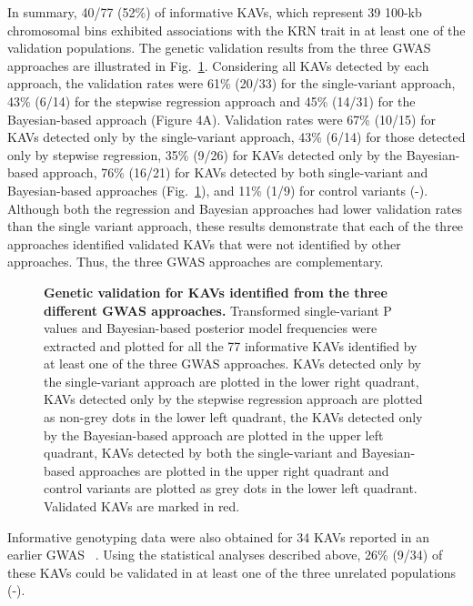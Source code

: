 \documentclass[10pt,letterpaper]{article}
\begin{document}
In summary, 40/77 (52\%) of informative KAVs, which represent 39 100-kb chromosomal bins exhibited associations with the KRN trait in at least one of the validation populations. The genetic validation results from the three GWAS approaches are illustrated in Fig.~\ref{fig4}. Considering all KAVs detected by each approach, the validation rates were 61\% (20/33) for the single-variant approach, 43\% (6/14) for the stepwise regression approach and 45\% (14/31) for the Bayesian-based approach (Figure 4A). Validation rates were 67\% (10/15) for KAVs detected only by the single-variant approach, 43\% (6/14) for those detected only by stepwise regression, 35\% (9/26) for KAVs detected only by the Bayesian-based approach, 76\% (16/21) for KAVs detected by both single-variant and Bayesian-based approaches (Fig.~\ref{fig4}), and 11\% (1/9) for control variants (-). Although both the regression and Bayesian approaches had lower validation rates than the single variant approach, these results demonstrate that each of the three approaches identified validated KAVs that were not identified by other approaches. Thus, the three GWAS approaches are complementary. 

\begin{figure}[h]
\caption{{\bf Genetic validation for KAVs identified from the three different GWAS approaches.}
Transformed single-variant P values and Bayesian-based posterior model frequencies were extracted and plotted for all the 77 informative KAVs identified by at least one of the three GWAS approaches. KAVs detected only by the single-variant approach are plotted in the lower right quadrant, KAVs detected only by the stepwise regression approach are plotted as non-grey dots in the lower left quadrant, the KAVs detected only by the Bayesian-based approach are plotted in the upper left quadrant, KAVs detected by both the single-variant and Bayesian-based approaches are plotted in the upper right quadrant and control variants are plotted as grey dots in the lower left quadrant. Validated KAVs are marked in red.}
\label{fig4}
\end{figure}

Informative genotyping data were also obtained for 34 KAVs reported in an earlier GWAS ~\cite{Brown2011}. Using the statistical analyses described above, 26\% (9/34) of these KAVs could be validated in at least one of the three unrelated populations (-).
\end{document}

